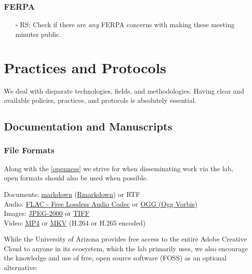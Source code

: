 \documentclass[
]{book}
\providecommand{\tightlist}{%
  \setlength{\itemsep}{0pt}\setlength{\parskip}{0pt}}
\begin{document}
\hypertarget{ferpa}{%
\subsection{FERPA}\label{ferpa}}

\begin{itemize}
\tightlist
\item[$\square$]
  RS: Check if there are \emph{any} FERPA concerns with making these meeting minutes public.
\end{itemize}

\hypertarget{protocols}{%
\chapter{Practices and Protocols}\label{protocols}}

We deal with disparate technologies, fields, and methodologies. Having clear and available policies, practices, and protocols is absolutely essential.

\hypertarget{docs-and-mans}{%
\section{Documentation and Manuscripts}\label{docs-and-mans}}

\hypertarget{fileformats}{%
\subsection{File Formats}\label{fileformats}}

Along with the \ref{openness} we strive for when disseminating work via the lab, open formats should also be used when possible.

Documents: \href{https://www.markdownguide.org/cheat-sheet}{markdown} (\href{https://uoepsy.github.io/usmr/cheatsheet/rmarkdown-2.0.pdf}{Rmarkdown}) or RTF\\
Audio: \href{https://xiph.org/flac/}{FLAC - Free Lossless Audio Codec} or \href{https://www.xiph.org/vorbis/}{OGG (Ogg Vorbis)}\\
Images: \href{https://jpeg.org/jpeg2000/index.html}{JPEG-2000} or \href{https://www.adobe.com/creativecloud/file-types/image/raster/tiff-file.html}{TIFF}\\
Video: \href{https://en.wikipedia.org/wiki/MPEG-4_Part_14}{MP4} or \href{https://en.wikipedia.org/wiki/Matroska}{MKV} (H.264 or H.265 encoded)

While the University of Arizona provides free access to the entire Adobe Creative Cloud to anyone in its ecosystem, which the lab primarily uses, we also encourage the knowledge and use of free, open source software (FOSS) as an optional alternative:
\end{document}
